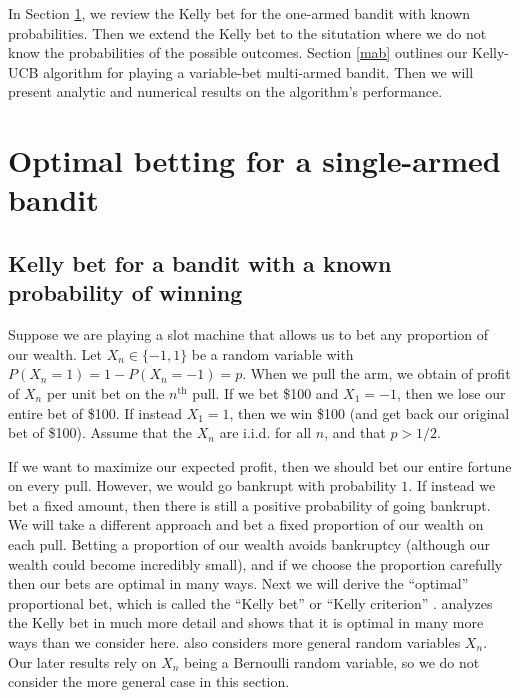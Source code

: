 \documentclass[letterpaper]{article}
\numberwithin{equation}{section}
\theoremstyle{plain}
\begin{document}
In Section \ref{singlearmed}, we review the Kelly bet for the one-armed bandit with known probabilities. Then we extend the Kelly bet to the situtation where we do not know the probabilities of the possible outcomes. Section \ref{mab} outlines our Kelly-UCB algorithm for playing a variable-bet multi-armed bandit. Then we will present analytic and numerical results on the algorithm's performance.

\section{Optimal betting for a single-armed bandit}\label{singlearmed}
\subsection{Kelly bet for a bandit with a known probability of winning}
Suppose we are playing a slot machine that allows us to bet any proportion of our wealth. Let $X_n\in\{-1,1\}$ be a random variable with $P(X_n = 1) = 1-P(X_n=-1) = p$.  When we pull the arm, we obtain of profit of $X_n$ per unit bet on the $n^\text{th}$ pull. If we bet \$100 and $X_1 = -1$, then we lose our entire bet of \$100. If instead $X_1 = 1$, then we win \$100 (and get back our original bet of \$100). Assume that the $X_n$ are i.i.d. for all $n$, and that $p > 1/2$.

If we want to maximize our expected profit, then we should bet our entire fortune on every pull. However, we would go bankrupt with probability $1$. If instead we bet a fixed amount, then there is still a positive probability of going bankrupt. We will take a different approach and bet a fixed proportion of our wealth on each pull. Betting a proportion of our wealth avoids bankruptcy (although our wealth could become incredibly small), and if we choose the proportion carefully then our bets are optimal in many ways. Next we will derive the ``optimal'' proportional bet, which is called the ``Kelly bet'' or ``Kelly criterion'' \citep{kelly1956new,thorp2006kelly}. \cite{ethier2010doctrine} analyzes the Kelly bet in much more detail and shows that it is optimal in many more ways than we consider here. \cite{ethier2010doctrine} also considers more general random variables $X_n$. Our later results rely on $X_n$ being a Bernoulli random variable, so we do not consider the more general case in this section.
\end{document}
